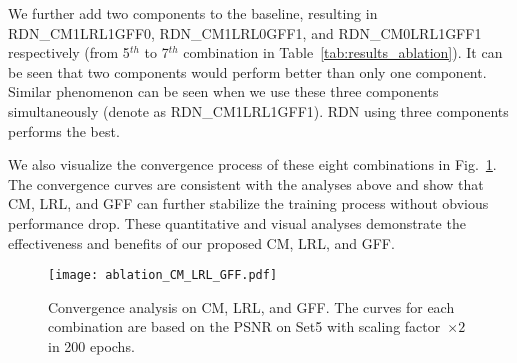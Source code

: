 \documentclass[10pt,twocolumn,letterpaper]{article}
\begin{document}
We further add two components to the baseline, resulting in RDN\_CM1LRL1GFF0, RDN\_CM1LRL0GFF1, and RDN\_CM0LRL1GFF1 respectively (from 5$^{th}$ to 7$^{th}$ combination in Table~\ref{tab:results_ablation}). It can be seen that two components would perform better than only one component. Similar phenomenon can be seen when we use these three components simultaneously (denote as RDN\_CM1LRL1GFF1). RDN using three components performs the best.

We also visualize the convergence process of these eight combinations in Fig.~\ref{fig:study_CM_LRL_GFF}. The convergence curves are consistent with the analyses above and show that CM, LRL, and GFF can further stabilize the training process without obvious performance drop. These quantitative and visual analyses demonstrate the effectiveness and benefits of our proposed CM, LRL, and GFF.


\begin{figure}[t]
\scriptsize
\centering
\centerline{
\texttt{[image: ablation\_CM\_LRL\_GFF.pdf]}}
\caption{Convergence analysis on CM, LRL, and GFF. The curves for each combination are based on the PSNR on Set5 with scaling factor~$\times2$ in 200 epochs.}  
\label{fig:study_CM_LRL_GFF}
\vspace{-5mm}
\end{figure}
\end{document}
